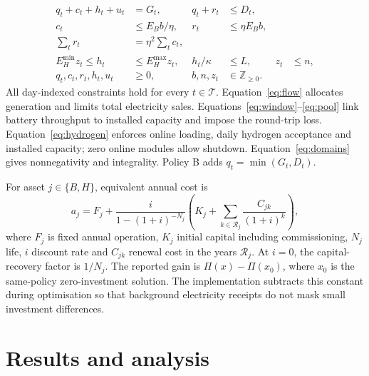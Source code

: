 \begin{subequations}\label{eq:constraints}
\begin{align}
q_t+c_t+h_t+u_t&=G_t,&q_t+r_t&\le D_t,\label{eq:flow}\\
c_t&\le E_Bb/\eta,&r_t&\le\eta E_Bb,\label{eq:window}\\
\sum_t r_t&=\eta^2\sum_t c_t,\label{eq:pool}\\
E_H^{\min}z_t\le h_t&\le E_H^{\max}z_t,&h_t/\kappa&\le L,&z_t&\le n,\label{eq:hydrogen}\\
q_t,c_t,r_t,h_t,u_t&\ge0,&b,n,z_t&\in\mathbb Z_{\ge0}.\label{eq:domains}
\end{align}
\end{subequations}
All day-indexed constraints hold for every \(t\in\mathcal T\).
Equation~\eqref{eq:flow} allocates generation and limits total electricity
sales. Equations~\eqref{eq:window}--\eqref{eq:pool} link battery throughput
to installed capacity and impose the round-trip loss. Equation~\eqref{eq:hydrogen}
enforces online loading, daily hydrogen acceptance and installed capacity;
zero online modules allow shutdown. Equation~\eqref{eq:domains} gives
nonnegativity and integrality. Policy B adds \(q_t=\min(G_t,D_t)\).

For asset \(j\in\{B,H\}\), equivalent annual cost is
\begin{equation}
a_j=F_j+\frac{i}{1-(1+i)^{-N_j}}
 \left(K_j+\sum_{k\in\mathcal R_j}\frac{C_{jk}}{(1+i)^k}\right),
\label{eq:annualcost}
\end{equation}
where \(F_j\) is fixed annual operation, \(K_j\) initial capital including
commissioning, \(N_j\) life, \(i\) discount rate and \(C_{jk}\) renewal cost
in the years \(\mathcal R_j\). At \(i=0\), the capital-recovery factor is
\(1/N_j\). The reported gain is \(\Pi(x)-\Pi(x_0)\), where \(x_0\)
is the same-policy zero-investment solution. The implementation subtracts
this constant during optimisation so that background electricity receipts
do not mask small investment differences.

\section{Results and analysis}\label{sec:results1}
